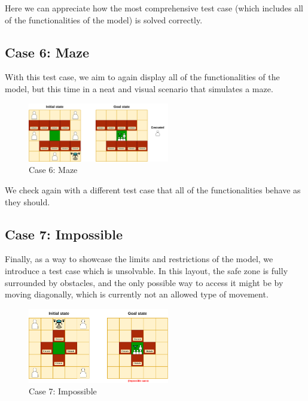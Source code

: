 \documentclass{article}
\begin{document}
Here we can appreciate how the most comprehensive test case (which includes all of the functionalities of the model) is solved correctly.

\subsection{Case 6: Maze}

With this test case, we aim to again display all of the functionalities of the model, but this time in a neat and visual scenario that simulates a maze.

\begin{figure}[ht]
    \centering
    \includegraphics[width=0.55\textwidth]{assets/problem-6-maze.drawio.png} %
    \caption{Case 6: Maze}
    \label{fig:initial-state-maze}
\end{figure}
\FloatBarrier

We check again with a different test case that all of the functionalities behave as they should.

\subsection{Case 7: Impossible}

Finally, as a way to showcase the limits and restrictions of the model, we introduce a test case which is unsolvable. In this layout, the safe zone is fully surrounded by obstacles, and the only possible way to access it might be by moving diagonally, which is currently not an allowed type of movement.

\begin{figure}[H]
    \centering
    \includegraphics[width=0.55\textwidth]{assets/problem-7-impossible.drawio.png} %
    \caption{Case 7: Impossible}
    \label{fig:initial-state-impossible}
\end{figure}
\FloatBarrier
\end{document}
